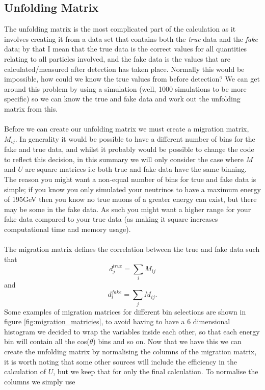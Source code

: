 \documentclass[12pt]{article}
\numberwithin{equation}{section}
\numberwithin{figure}{section}
\begin{document}
\subsection{Unfolding Matrix} 
\label{sub:unfolding_matrix}
The unfolding matrix is the most complicated part of the calculation as it involves creating it from a data set that contains both the \emph{true} data and the \emph{fake} data; by that I mean that the true data is the correct values for all quantities relating to all particles involved, and the fake data is the values that are calculated/measured after detection has taken place. Normally this would be impossible, how could we know the true values from before detection? We can get around this problem by using a simulation (well, 1000 simulations to be more specific) so we can know the true and fake data and work out the unfolding matrix from this.\\
\\
Before we can create our unfolding matrix we must create a migration matrix, $M_{ij}$. In generality it would be possible to have a different number of bins for the fake and true data, and whilst it probably would be possible to change the code to reflect this decision, in this summary we will only consider the case where $M$ and $U$ are square matrices i.e both true and fake data have the same binning. The reason you might want a non-equal number of bins for true and fake data is simple; if you know you only simulated your neutrinos to have a maximum energy of 195GeV then you know no true muons of a greater energy can exist, but there may be some in the fake data. As such you might want a higher range for your fake data compared to your true data (as making it square increases computational time and memory usage). \\
\\
The migration matrix defines the correlation between the true and fake data such that
\begin{equation}
	d_j^{true} = \sum\limits_i M_{ij}
	\label{eq:true}
\end{equation}
and 
\begin{equation}
	d_i^{fake} = \sum\limits_j M_{ij}.
	\label{eq:fake}
\end{equation}
Some examples of migration matrices for different bin selections are shown in figure \ref{fig:migration_matricies}, to avoid having to have a 6 dimensional histogram we decided to wrap the variables inside each other, so that each energy bin will contain all the cos($\theta$) bins and so on. Now that we have this we can create the unfolding matrix by normalising the columns of the migration matrix, it is worth noting that some other sources will include the efficiency in the calculation of $U$, but we keep that for only the final calculation. To normalise the columns we simply use
\end{document}
